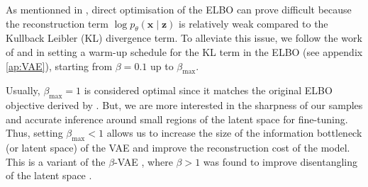 \documentclass[twocolumn]{aastex631}
\begin{document}
As mentionned in \citet{Kingma2019}, direct optimisation 
of the ELBO can prove difficult because the reconstruction term $\log p_\theta (\mathbf{x} \mid \mathbf{z})$ 
is relatively weak compared to the Kullback Leibler (KL) divergence term. To alleviate this issue, 
we follow the work of \citet{Bowman2015} and \citet{Sonderby2016} in setting a warm-up 
schedule for the KL term in the ELBO (see appendix \ref{ap:VAE}), 
starting from $\beta=0.1$ up to $\beta_{\mathrm{max}}$. 

Usually, 
$\beta_{\mathrm{max}} = 1$ is considered optimal since it matches the original ELBO  
objective derived by \citet{Kingma2013}. 
But, we are more interested in the 
sharpness of our samples and accurate inference around small regions of the latent 
space for fine-tuning. Thus, setting $\beta_{\mathrm{max}} < 1$ allows us to increase 
the size of the information bottleneck (or latent space) of the VAE 
and improve the reconstruction cost of the model. 
This is a variant of the $\beta$-VAE \citep{Higgins2017}, where $\beta > 1$ was found 
to improve disentangling of the latent space \citep{Burgess2018}. 
\end{document}
